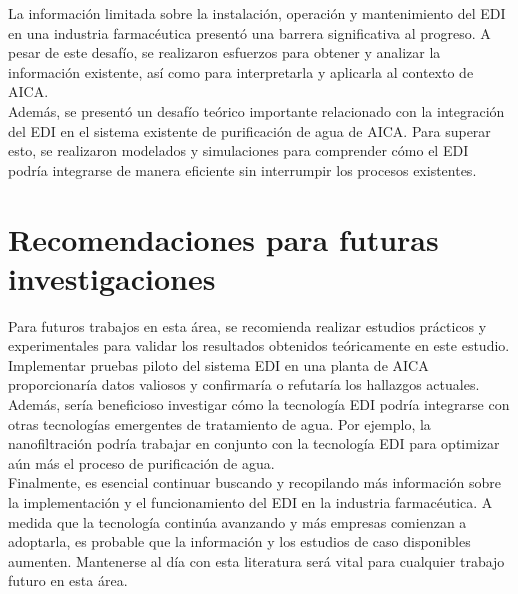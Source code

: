 La información limitada sobre la instalación, operación y mantenimiento del EDI
en una industria farmacéutica presentó una barrera significativa al progreso. A
pesar de este desafío, se realizaron esfuerzos para obtener y analizar la información
existente, así como para interpretarla y aplicarla al contexto de AICA.\\

Además, se presentó un desafío teórico importante relacionado con la integración
del EDI en el sistema existente de purificación de agua de AICA. Para superar esto,
se realizaron modelados y simulaciones para comprender cómo el EDI podría
integrarse de manera eficiente sin interrumpir los procesos existentes.\\

\section*{Recomendaciones para futuras investigaciones}


Para futuros trabajos en esta área, se recomienda realizar estudios prácticos y
experimentales para validar los resultados obtenidos teóricamente en este estudio.
Implementar pruebas piloto del sistema EDI en una planta de AICA proporcionaría
datos valiosos y confirmaría o refutaría los hallazgos actuales.\\

Además, sería beneficioso investigar cómo la tecnología EDI podría integrarse
con otras tecnologías emergentes de tratamiento de agua. Por ejemplo,
la nanofiltración podría
trabajar en conjunto con la tecnología EDI para optimizar aún más el
proceso de purificación de agua.\\

Finalmente, es esencial continuar buscando y recopilando más información
sobre la implementación y el funcionamiento del EDI en la industria farmacéutica.
A medida que la tecnología continúa avanzando y más empresas comienzan a adoptarla,
es probable que la información y los estudios de caso disponibles aumenten.
Mantenerse al día con esta literatura será vital para cualquier trabajo futuro en esta área.